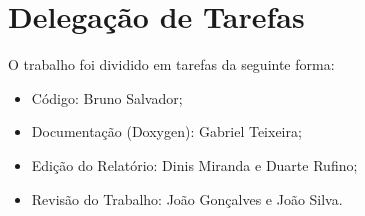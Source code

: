 \section{Delegação de Tarefas}
\label{sec:deleg}

O trabalho foi dividido em tarefas da seguinte forma:
\begin{itemize}
    \item Código: Bruno Salvador;
    \item Documentação (Doxygen): Gabriel Teixeira;
    \item Edição do Relatório: Dinis Miranda e Duarte Rufino;
    \item Revisão do Trabalho: João Gonçalves e João Silva.
\end{itemize}